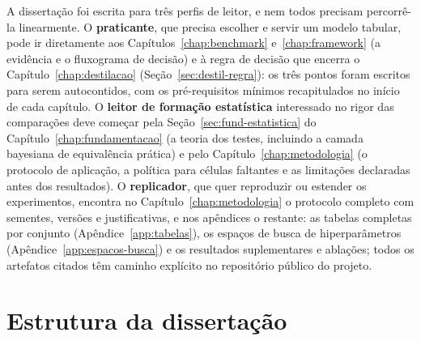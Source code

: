 A dissertação foi escrita para três perfis de leitor, e nem todos precisam
percorrê-la linearmente. O \textbf{praticante}, que precisa escolher e
servir um modelo tabular, pode ir diretamente aos
Capítulos~\ref{chap:benchmark} e~\ref{chap:framework} (a evidência e o
fluxograma de decisão) e à regra de decisão que encerra o
Capítulo~\ref{chap:destilacao} (Seção~\ref{sec:destil-regra}): os três
pontos foram escritos para serem autocontidos, com os pré-requisitos
mínimos recapitulados no início de cada capítulo. O \textbf{leitor de
formação estatística} interessado no rigor das comparações deve começar
pela Seção~\ref{sec:fund-estatistica} do Capítulo~\ref{chap:fundamentacao}
(a teoria dos testes, incluindo a camada bayesiana de equivalência
prática) e pelo Capítulo~\ref{chap:metodologia} (o protocolo de aplicação,
a política para células faltantes e as limitações declaradas antes dos
resultados). O \textbf{replicador}, que quer reproduzir ou estender os
experimentos, encontra no Capítulo~\ref{chap:metodologia} o protocolo
completo com sementes, versões e justificativas, e nos apêndices o
restante: as tabelas completas por conjunto
(Apêndice~\ref{app:tabelas}), os espaços de busca de hiperparâmetros
(Apêndice~\ref{app:espacos-busca}) e os resultados suplementares e
ablações; todos os artefatos citados têm caminho explícito no repositório
público do projeto.

\section{Estrutura da dissertação}
\label{sec:intro-estrutura}


